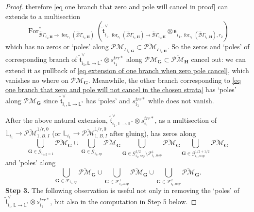 \documentclass[11pt]{amsart}
\theoremstyle{definition}
\theoremstyle{remark}
\newcommand{\oPMb}{{\overline{\mathcal{PM}}}}
\newcommand{\nontilde}{}
\newcommand{\<}{\left<}
\renewcommand{\>}{\right>}
\numberwithin{equation}{section}
\begin{document}
\begin{proof}
        therefore  \eqref{eq one branch that zero and pole will cancel in proof} can extends to a multisection
        \begin{equation}\label{eq extension of one branch when zero pole cancel}
        \operatorname{For}^*_{\hat{\mathcal B}\Gamma_{i_1,\bm{H}} \to \operatorname{for}_{r_1}(\hat{\mathcal B}\Gamma_{i_1,\bm{H}})}
        (\tilde{\mathfrak t}^\vee_{i_1,\operatorname{for}_{r_1}(\hat{\mathcal B}\Gamma_{i_1,\bm{H}})\to\hat{\mathcal B}\Gamma_{i_1,\bm{H}}} \otimes \mathfrak s_{i_1,\operatorname{for}_{r_1}(\hat{\mathcal B}\Gamma_{i_1,\bm{H}}),r_2})
        \end{equation}
        which has no zeros or `poles' along $\mathcal{PM}_{\Gamma_{i_1,\bm{G}}}\subset \oPMb_{\Gamma_{i_1,\bm{H}}}$. So the zeros and `poles' of corresponding branch of $\tilde{\mathfrak{t}}^{\vee}_{i_1,\mathbb L \to \mathbb L^*}\otimes
        \nontilde{s}^{trr*}_{i_1}$  along $\mathcal{PM}_{\bm{G}}\subset \oPMb_{\bm{H}}$ cancel out: we can extend it as pullback of \eqref{eq extension of one branch when zero pole cancel}, which vanishes no where on $\mathcal{PM}_{\bm{G}}$. Meanwhile, the other branch corresponding to \eqref{eq one branch that zero and pole will not cancel in the chosen strata} has `poles' along $\mathcal{PM}_{\bm{G}}$ since $\tilde{\mathfrak{t}}^{\vee}_{i_1,\mathbb L \to \mathbb L^*}$ has `poles' and $ \nontilde{s}^{trr*}_{i_1}$ while does not vanish.

        After the above natural extension, $\tilde{\mathfrak{t}}^{\vee}_{i_1,\mathbb L \to \mathbb L^*}\otimes \nontilde{s}^{trr*}_{i_1}$, as a multisection of  $\mathbb L_{i_1}\to \oPMb^{1/r,0}_{1,B,I}$ (or  $\mathbb L_{i_1}\to \oPMb^{1/r,0}_{1,B,I}$ after gluing),  has zeros along 
        $$
        \bigcup_{\bm{G}\in \bm{\mathcal G}_{i_1,g=1} } \oPMb_{\bm{G}} \cup \bigcup_{\bm{G}\in  \bm{\mathcal G}_{i_1,sp} } \oPMb_{\bm{G}} \bigcup_{\bm{G}\in  \bm{\mathcal G}^{1/2}_{i_1,nsp} \setminus \bm{\mathcal F}^1_{i_1,nsp}} \oPMb_{\bm{G}} \bigcup_{\bm{G}\in \bm{\mathcal G}^{1/2+1/2}_{i_1,nsp}} \oPMb_{\bm{G}}
        $$
        and 'poles' along
        $$
        \bigcup_{\mathbf{G}\in \bm{\mathcal F}_{i_1,sp}} \oPMb_{\mathbf{G}} \cup \bigcup_{\mathbf{G}\in \bm{\mathcal F}^1_{i_1,nsp}} \oPMb_{\mathbf{G}} \cup \bigcup_{\mathbf{G}\in\bm{\mathcal F}^2_{i_1,nsp}} \oPMb_{\mathbf{G}}.
        $$
        \noindent\textbf{Step 3.} The following observation is useful  not only in removing the `poles' of $\tilde{\mathfrak{t}}^{\vee}_{i_1,\mathbb L \to \mathbb L^*}\otimes \nontilde{s}^{trr*}_{i_1}$, but also in the computation in Step 5 below.
        

\end{proof}
\end{document}
